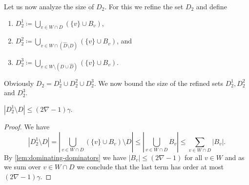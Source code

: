 \pagebreak

%

%


Let us now analyze the size of $D_2$. For this we refine the set $D_2$
and define
\begin{tcolorbox}
  \begin{enumerate}
    \item $D_2^1\coloneqq \bigcup_{v\in W\cap D}
    (\{v\}\cup B_v)$, \smallskip
    \item $D_2^2\coloneqq \bigcup_{v\in W\cap (\hat{D}\setminus D)}
    (\{v\}\cup B_v)$, and \smallskip
    \item $D_2^3\coloneqq \bigcup_{v\in W\setminus (D\cup \hat{D})}
    (\{v\}\cup B_v)$.
  \end{enumerate}
\end{tcolorbox}

\smallskip
Obviously $D_2=D_2^1\cup D_2^2\cup D_2^3$. We now bound the size of the
refined sets $D_2^1,D_2^2$ and $D_2^3$.

\begin{lemma}\label{lem:size-D21}
  $|D_2^1\setminus D|\leq (2\nabla-1)\gamma$.
\end{lemma}
\begin{proof}
  We have
  \[|D_2^1\setminus D|= |\bigcup_{v\in W\cap D} (\{v\}\cup
    B_v)\setminus D|\leq |\bigcup_{v\in W\cap D}B_v|\leq \sum_{v\in
      W\cap D}|B_v|.\] By \cref{lem:dominating-dominators} we have
  $|B_v|\leq (2\nabla-1)$ for all $v\in W$ and as we sum over $v\in W\cap D$ we
  conclude that the last term has order at most $(2\nabla-1)\gamma$.
\end{proof}

